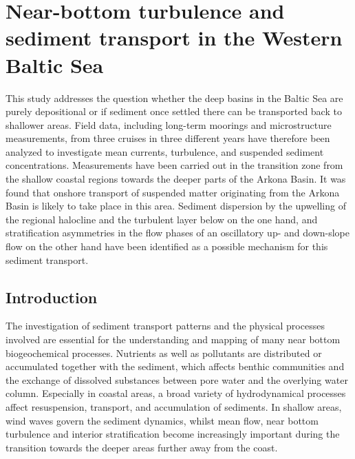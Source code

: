 \chapter{Near-bottom turbulence and sediment transport in the Western Baltic 
Sea}
\label{kap-measure}

This study addresses the question whether the deep basins in the Baltic Sea are 
purely depositional or if sediment once settled there can be transported back 
to shallower areas. Field data, including long-term moorings and 
microstructure measurements, from three cruises in three different years 
have therefore been analyzed to investigate mean currents, turbulence, 
and suspended sediment concentrations. Measurements have been carried out in 
the 
transition zone from the shallow coastal regions towards the deeper parts 
of the Arkona Basin. It was found that 
onshore transport of suspended matter originating from the Arkona Basin is 
likely to take place in this area. Sediment dispersion by the upwelling of 
the regional halocline and the turbulent layer 
below on the one hand, and stratification asymmetries in the flow 
phases of an oscillatory up- and down-slope flow on the other hand have been 
identified as a 
possible mechanism for this sediment transport.

\section{Introduction}\label{introdaten}

The investigation of sediment transport patterns and the physical processes 
involved are essential for the understanding and mapping of many near bottom 
biogeochemical processes. Nutrients as well as pollutants are distributed or 
accumulated together with the sediment, which affects benthic communities and 
the exchange of dissolved substances between pore water and the overlying 
water column. Especially in coastal areas, a broad variety of hydrodynamical 
processes affect resuspension, transport, and accumulation of sediments. In 
shallow areas, wind waves govern the sediment dynamics, whilst mean flow, near 
bottom turbulence and interior stratification become increasingly important 
during the transition towards the deeper areas further away from the coast.

